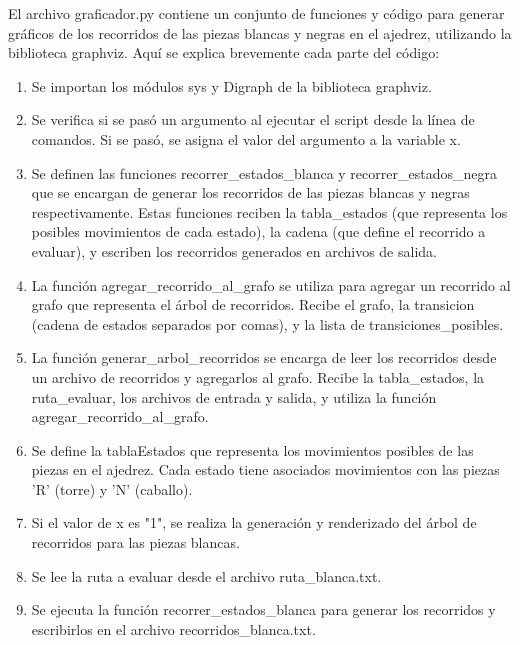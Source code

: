 \begin{enumerate}
El archivo graficador.py contiene un conjunto de funciones y código para generar gráficos de los recorridos de las piezas blancas y negras en el ajedrez, utilizando la biblioteca graphviz. Aquí se explica brevemente cada parte del código:\newline
\begin{enumerate}
    \item Se importan los módulos sys y Digraph de la biblioteca graphviz.\newline
    \item Se verifica si se pasó un argumento al ejecutar el script desde la línea de comandos. Si se pasó, se asigna el valor del argumento a la variable x.\newline
    \item Se definen las funciones recorrer\_estados_blanca y recorrer\_estados\_negra que se encargan de generar los recorridos de las piezas blancas y negras respectivamente. Estas funciones reciben la tabla\_estados (que representa los posibles movimientos de cada estado), la cadena (que define el recorrido a evaluar), y escriben los recorridos generados en archivos de salida.\newline
    \item La función agregar\_recorrido\_al\_grafo se utiliza para agregar un recorrido al grafo que representa el árbol de recorridos. Recibe el grafo, la transicion (cadena de estados separados por comas), y la lista de transiciones\_posibles.\newline
    \item La función generar\_arbol\_recorridos se encarga de leer los recorridos desde un archivo de recorridos y agregarlos al grafo. Recibe la tabla\_estados, la ruta\_evaluar, los archivos de entrada y salida, y utiliza la función agregar\_recorrido\_al\_grafo.\newline
    \item Se define la tablaEstados que representa los movimientos posibles de las piezas en el ajedrez. Cada estado tiene asociados movimientos con las piezas 'R' (torre) y 'N' (caballo).\newline
    \item Si el valor de x es "1", se realiza la generación y renderizado del árbol de recorridos para las piezas blancas.\newline
    \item Se lee la ruta a evaluar desde el archivo ruta\_blanca.txt.\newline
    \item Se ejecuta la función recorrer\_estados\_blanca para generar los recorridos y escribirlos en el archivo recorridos\_blanca.txt.\newline

\end{enumerate}
\end{enumerate}

